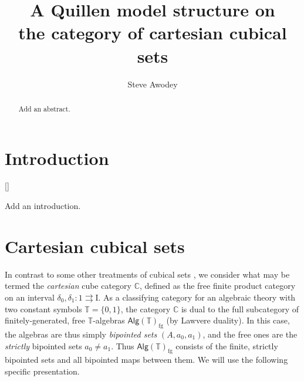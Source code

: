 \documentclass[12pt]{article}
\newcommand{\ednote}[1]{[\textit{\color{red}{#1}}]} %
\newcommand{\C}{\ensuremath{\mathbb{C}}}
\newcommand{\CC}{\ensuremath{\mathcal{C}}}
\newcommand{\I}{\ensuremath{\mathrm{I}}}
\newcommand{\U}{\ensuremath{\mathcal{U}}}
\theoremstyle{remark}
\theoremstyle{definition}
\begin{document}

\title{A Quillen model structure on\\
the category of cartesian cubical sets}
\author{Steve Awodey}
\maketitle

\begin{abstract}
Add an abstract.
\end{abstract}

\setcounter{tocdepth}{1}
\tableofcontents

\section*{Introduction}

\ednote{need to fix long arrows and epi arrow commands}

Add an introduction.

%
%
%
%
%
%
%
%
%
\section{Cartesian cubical sets}

In contrast to some other treatments of cubical sets \cite{Grandis, Grandis, Jardine, Jardine, Bezem, OrtonPitts, Coquand, Cisinski}, we consider what may be termed the \emph{cartesian} cube category  $\mathbb{C}$, defined as the free finite product category on an interval $\delta_0, \delta_1 : 1\rightrightarrows \I$.
As a classifying category for an algebraic theory with two constant symbols $\mathbb{T} = \{0, 1\}$, the category $\C$ is dual to the full subcategory of finitely-generated, free $\mathbb{T}$-algebras $\mathsf{Alg}(\mathbb{T})_{\mathrm{fg}}$ (by Lawvere duality).  In this case, the algebras are thus simply \emph{bipointed sets} $(A, a_0, a_1)$, and the free ones are the \emph{strictly} bipointed sets $a_0\neq a_1$.  Thus $\mathsf{Alg}(\mathbb{T})_{\mathrm{fg}}$ consists of the finite, strictly bipointed sets and all bipointed maps between them.  We will use the following specific presentation.
\end{document}
